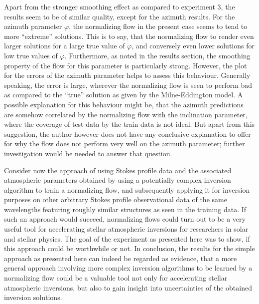 \documentclass[a4paper,11pt]{report}
\def\fc#1{{\color{black}{#1}}} %
\begin{document}
Apart from the stronger smoothing effect as compared to experiment 3, the results seem to be of similar quality, except for the azimuth results. For the azimuth parameter $\varphi$, the normalizing flow in the present case seems to tend to more ``extreme'' solutions. This is to say, that the normalizing flow \fc{exhibits a tendency} to render even larger solutions for a large true value of $\varphi$, and conversely even lower solutions for low true values of $\varphi$. Furthermore, as noted in the results section, the smoothing property of the flow for this parameter is particularly strong. However, the plot for the errors of the azimuth parameter helps to assess this behaviour. Generally speaking, the error is large, wherever the normalizing flow is seen to perform bad as compared to the ``true'' solution as given by the Milne-Eddington model. A possible explanation for this behaviour might be, that the azimuth predictions are somehow correlated by the normalizing flow with the inclination parameter, where the coverage of test data by the train data is not ideal. But apart from this suggestion, the author however does not have any conclusive explanation to offer for why the flow does not perform very well on the azimuth parameter; further investigation would be needed to answer that question. \fc{A possible experiment to resolve this would be to train the normalizing flow on a dataset with better coverage of the inclination parameter $\theta$. This is because non-ideal representation of inclination data in the training dataset might affect the performance of the normalizing flow on azimuth predictions, if azimuth and inclination are indeed interwoven by the normalizing flow model as suggested.}

Consider now the approach of using Stokes profile data and the associated atmospheric parameters obtained by using a potentially complex inversion algorithm to train a normalizing flow, and subsequently applying it for inversion purposes on other arbitrary Stokes profile observational data of the same wavelengths featuring roughly similar structures as seen in the training data. If such an approach would succeed, normalizing flows could turn out to be a very useful tool for accelerating stellar atmospheric inversions for researchers in solar and stellar physics. The goal of the experiment as presented here was to show, if this approach could be worthwhile or not. In conclusion, the results for the simple approach as presented here can indeed be regarded as evidence, that a more general approach involving more complex inversion algorithms to be learned by a normalizing flow could be a valuable tool not only for accelerating stellar atmospheric inversions, but also to gain insight into uncertainties of the obtained inversion solutions.
\end{document}
